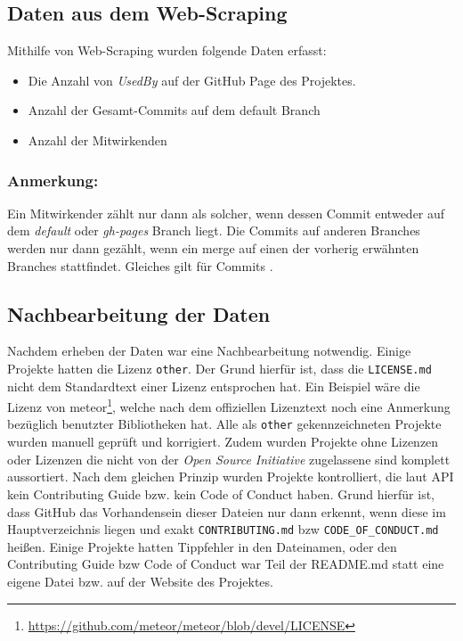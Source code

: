 
\subsection{Daten aus dem Web-Scraping}
Mithilfe von Web-Scraping wurden folgende Daten erfasst:

\begin{itemize}[noitemsep]
    \item Die Anzahl von \textit{UsedBy} auf der GitHub Page des Projektes.
    \item Anzahl der Gesamt-Commits auf dem default Branch
    \item Anzahl der Mitwirkenden
\end{itemize}

\subsubsection*{Anmerkung:}
Ein Mitwirkender zählt nur dann als solcher, wenn dessen Commit entweder auf dem \textit{default}
oder \textit{gh-pages} Branch liegt. Die Commits auf anderen Branches werden nur dann gezählt,
wenn ein merge auf einen der vorherig erwähnten Branches stattfindet. Gleiches gilt für Commits \cite{GHapiDocsCommits}.



\subsection{Nachbearbeitung der Daten}

Nachdem erheben der Daten war eine Nachbearbeitung notwendig. Einige Projekte hatten die Lizenz
\texttt{other}. Der Grund hierfür ist, dass die \texttt{LICENSE.md} nicht dem Standardtext einer
Lizenz entsprochen hat. Ein Beispiel wäre die Lizenz von
meteor\footnote{\url{https://github.com/meteor/meteor/blob/devel/LICENSE}},
welche nach dem offiziellen Lizenztext noch eine Anmerkung bezüglich benutzter Bibliotheken hat.
Alle als \texttt{other} gekennzeichneten Projekte wurden manuell geprüft und korrigiert.
%
Zudem wurden Projekte ohne Lizenzen oder Lizenzen die nicht von der \textit{Open Source Initiative}
zugelassene sind komplett aussortiert.
%
Nach dem gleichen Prinzip wurden Projekte kontrolliert, die laut API kein Contributing Guide bzw. kein Code
of Conduct haben. Grund hierfür ist, dass GitHub das Vorhandensein dieser Dateien nur dann erkennt,
wenn diese im Hauptverzeichnis liegen und exakt \texttt{CONTRIBUTING.md} bzw \texttt{CODE\_OF\_CONDUCT.md}
heißen. Einige Projekte hatten Tippfehler in den Dateinamen, oder den Contributing Guide bzw Code of Conduct
war Teil der README.md statt eine eigene Datei bzw. auf der Website des Projektes.





